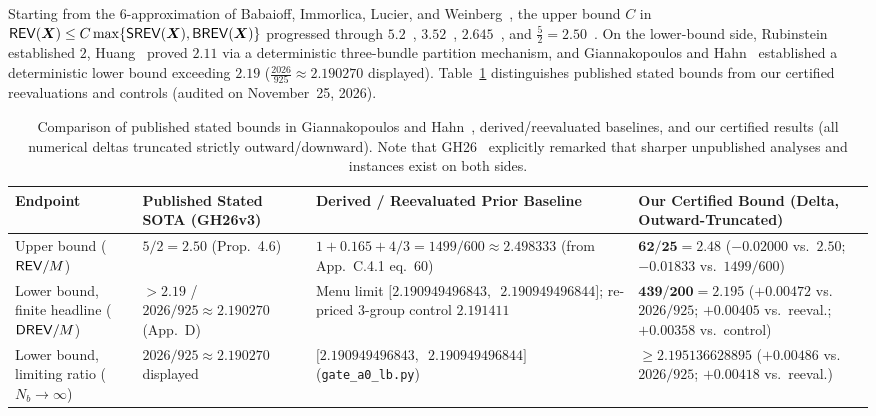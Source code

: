 Starting from the $6$-approximation of Babaioff, Immorlica, Lucier, and Weinberg~\cite{BILW20}, the upper bound $C$ in $\mathsf{REV}(\bm{X}) \le C\max\{\mathsf{SREV}(\bm{X}),\mathsf{BREV}(\bm{X})\}$ progressed through $5.2$~\cite{MaSimchiLevi21}, $3.52$~\cite{CaiEtAl26}, $2.645$~\cite{Huang26}, and $\frac{5}{2} = 2.50$~\cite[Proposition~4.6]{GiannakopoulosHahn26}. On the lower-bound side, Rubinstein~\cite{Rubinstein16} established $2$, Huang~\cite{Huang26} proved $2.11$ via a deterministic three-bundle partition mechanism, and Giannakopoulos and Hahn~\cite[Theorem~D.1, Appendix~D]{GiannakopoulosHahn26} established a deterministic lower bound exceeding $2.19$ ($\frac{2026}{925} \approx 2.190270$ displayed). Table~\ref{tab:md-baselines} distinguishes published stated bounds from our certified reevaluations and controls (audited on November~25, 2026).

\begin{table}[h]
\centering\footnotesize\setlength{\tabcolsep}{4pt}
\begin{tabular}{p{3.4cm} p{3.4cm} p{4.2cm} p{4.0cm}}
\toprule
Endpoint & Published Stated SOTA (GH26v3) & Derived / Reevaluated Prior Baseline & Our Certified Bound (Delta, Outward-Truncated) \\
\midrule
Upper bound ($\mathsf{REV}/M$) & $5/2 = 2.50$ (Prop.~4.6) & $1 + 0.165 + 4/3 = 1499/600 \approx 2.498333$ (from App.~C.4.1 eq.~60) & $\mathbf{62/25 = 2.48}$ ($-0.02000$ vs.\ $2.50$; $-0.01833$ vs.\ $1499/600$) \\
Lower bound, finite headline ($\mathsf{DREV}/M$) & $> 2.19$ / $2026/925 \approx 2.190270$ (App.~D) & Menu limit $[2.190949496843,\,$ $2.190949496844]$; re-priced 3-group control $2.191411$ & $\mathbf{439/200 = 2.195}$ ($+0.00472$ vs.\ $2026/925$; $+0.00405$ vs.\ reeval.; $+0.00358$ vs.\ control) \\
Lower bound, limiting ratio ($N_b \to \infty$) & $2026/925 \approx 2.190270$ displayed & $[2.190949496843,\,$ $2.190949496844]$ (\texttt{gate\_a0\_lb.py}) & $\ge \mathbf{2.195136628895}$ ($+0.00486$ vs.\ $2026/925$; $+0.00418$ vs.\ reeval.) \\
\bottomrule
\end{tabular}
\caption{Comparison of published stated bounds in Giannakopoulos and Hahn~\cite{GiannakopoulosHahn26}, derived/reevaluated baselines, and our certified results (all numerical deltas truncated strictly outward/downward). Note that GH26~\cite[Appendices~C.4 and~D]{GiannakopoulosHahn26} explicitly remarked that sharper unpublished analyses and instances exist on both sides.}
\label{tab:md-baselines}
\end{table}

